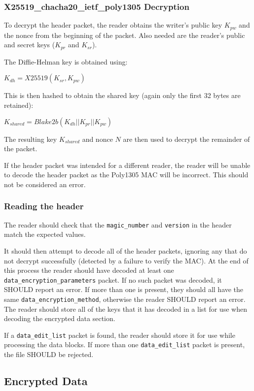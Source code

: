 \documentclass[10pt]{article}
\newcommand{\kw}[1]{\texttt{#1}}
\begin{document}
\subsubsection{X25519\_chacha20\_ietf\_poly1305 Decryption}

To decrypt the header packet, the reader obtains the writer's public key $K_{pw}$ and the nonce from the beginning
of the packet.
Also needed are the reader's public and secret keys ($K_{pr}$ and $K_{sr}$).

The Diffie-Helman key is obtained using:

$K_{dh} = X25519(K_{sr}, K_{pw})$

This is then hashed to obtain the shared key (again only the first 32 bytes are retained):

$K_{shared} = Blake2b(K_{dh} || K_{pr} || K_{pw})$

The resulting key $K_{shared}$ and nonce $N$ are then used to decrypt the remainder of the packet.

If the header packet was intended for a different reader, the reader will be unable to decode the header packet
as the Poly1305 MAC will be incorrect.
This should not be considered an error.

\subsubsection{Reading the header}

The reader should check that the \kw{magic\_number} and \kw{version} in the header match the expected values.

It should then attempt to decode all of the header packets, ignoring any that do not decrypt successfully
(detected by a failure to verify the MAC).
At the end of this process the reader should have decoded at least one \kw{data\_encryption\_parameters} packet.
If no such packet was decoded, it SHOULD report an error.
If more than one is present, they should all have the same \kw{data\_encryption\_method}, otherwise the reader
SHOULD report an error.
The reader should store all of the keys that it has decoded in a list for use when decoding the encrypted data section.

If a \kw{data\_edit\_list} packet is found, the reader should store it for use while processing the data blocks.
If more than one \kw{data\_edit\_list} packet is present, the file SHOULD be rejected.

\subsection{Encrypted Data}\label{data:encryption}
\end{document}
